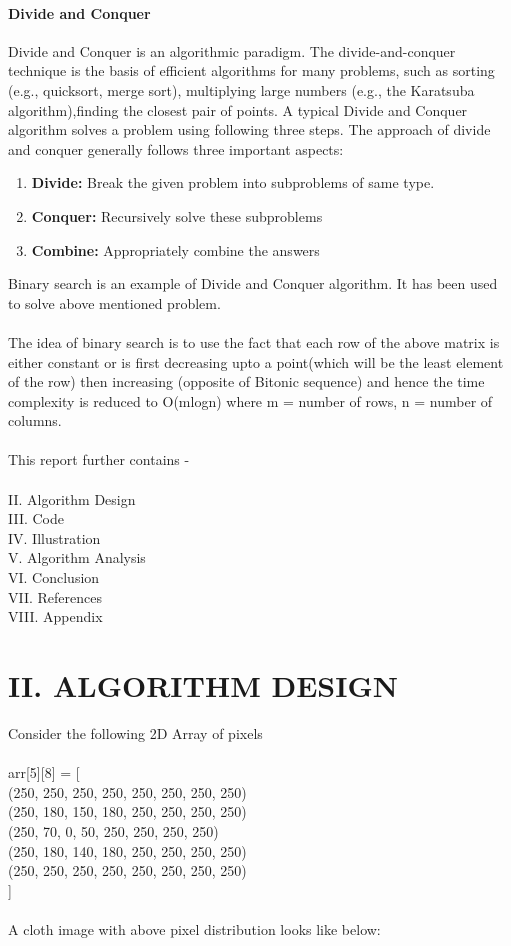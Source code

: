 \documentclass[10pt]{article}
\begin{document}
\begin{multicols*}{2}
\paragraph{Divide and Conquer}
Divide and Conquer is an algorithmic paradigm. The divide-and-conquer technique is the basis of efficient algorithms for many problems, such as sorting (e.g., quicksort, merge sort), multiplying large numbers (e.g., the Karatsuba algorithm),finding the closest pair of points. A typical Divide and Conquer algorithm solves a problem using following three steps. 
 The approach of divide and conquer generally follows three important aspects:
\begin{enumerate}
    \item\textbf{Divide:} Break the given problem into subproblems of same type.
    \item\textbf{Conquer:} Recursively solve these subproblems
    \item\textbf{Combine:} Appropriately combine the answers\\
\end{enumerate}Binary search is an example of Divide and Conquer algorithm. It has been used to solve above mentioned problem.\\\\The idea of binary search is to use the fact that each row of the above matrix is either constant or is first decreasing upto a point(which will be the least element of the row) then increasing (opposite of Bitonic sequence) and hence the time complexity is reduced to O(mlogn) where m = number of rows, n = number of columns.\\\\This report further contains -\\\\II. Algorithm Design\\III. Code\\IV. Illustration\\V. Algorithm Analysis\\VI. Conclusion\\VII. References\\VIII. Appendix


\section*{II. ALGORITHM DESIGN}
Consider the following 2D Array of pixels\\\\ arr[5][8] = [\\(250, 250, 250, 250, 250, 250, 250, 250)\\(250, 180, 150, 180, 250, 250, 250, 250)\\(250, 70, 0, 50, 250, 250, 250, 250)\\(250, 180, 140, 180, 250, 250, 250, 250)\\(250, 250, 250, 250, 250, 250, 250, 250)\\]\\\\A cloth image with above pixel distribution looks like below:\\


\end{multicols*}
\end{document}
